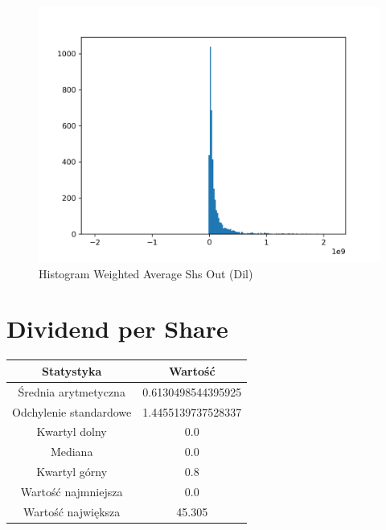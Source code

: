 \documentclass{article}
\begin{document}
\begin{figure}[h!]
    \includegraphics[width=\linewidth]{variables/Weighted Average Shs Out (Dil).png}
    \caption{Histogram Weighted Average Shs Out (Dil) }
\end{figure}\section{ Dividend per Share }

\begin{center}
    \begin{tabular}{|c | c|} 
    \hline
    Statystyka & Wartość \\
    \hline\hline
    Średnia arytmetyczna & 0.6130498544395925 \\ 
    \hline
    Odchylenie standardowe & 1.4455139737528337 \\
    \hline
    Kwartyl dolny & 0.0 \\
    \hline
    Mediana & 0.0 \\
    \hline
    Kwartyl górny & 0.8 \\
    \hline
    Wartość najmniejsza & 0.0 \\
    \hline
    Wartość największa & 45.305 \\
    \hline
   \end{tabular}
\end{center}
\end{document}
